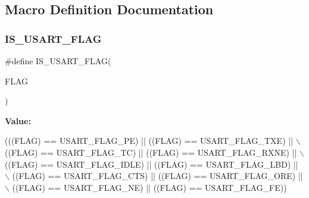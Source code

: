 \subsection{Macro Definition Documentation}
\mbox{\label{group___u_s_a_r_t___flags_ga3e20747ce7c97a36718933c0cb3dac29}} 
\subsubsection{\texorpdfstring{I\+S\+\_\+\+U\+S\+A\+R\+T\+\_\+\+F\+L\+AG}{IS\_USART\_FLAG}}
{\footnotesize\ttfamily \#define I\+S\+\_\+\+U\+S\+A\+R\+T\+\_\+\+F\+L\+AG(\begin{DoxyParamCaption}\item[{}]{F\+L\+AG }\end{DoxyParamCaption})}

{\bfseries Value\+:}
\begin{DoxyCode}
(((FLAG) == USART\_FLAG\_PE) || ((FLAG) == USART\_FLAG\_TXE) || \(\backslash\)
                             ((FLAG) == USART\_FLAG\_TC) || ((FLAG) == USART\_FLAG\_RXNE) || \(\backslash\)
                             ((FLAG) == USART\_FLAG\_IDLE) || ((FLAG) == USART\_FLAG\_LBD) || \(\backslash\)
                             ((FLAG) == USART\_FLAG\_CTS) || ((FLAG) == USART\_FLAG\_ORE) || \(\backslash\)
                             ((FLAG) == USART\_FLAG\_NE) || ((FLAG) == USART\_FLAG\_FE))
\end{DoxyCode}
